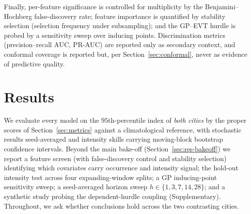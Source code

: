 \documentclass[11pt,a4paper]{article}
\begin{document}
Finally, per-feature significance is controlled for multiplicity by the
Benjamini--Hochberg false-discovery rate; feature importance is quantified by
stability selection (selection frequency under subsampling); and the GP--EVT
hurdle is probed by a sensitivity sweep over inducing points. Discrimination
metrics (precision--recall AUC, PR-AUC) are reported only as secondary context,
and conformal coverage is reported but, per Section~\ref{sec:conformal}, never as
evidence of predictive quality.

\section{Results}\label{sec:results}

We evaluate every model on the $95$th-percentile index of \emph{both cities} by
the proper scores of Section~\ref{sec:metrics} against a climatological reference,
with stochastic results seed-averaged and intensity skills carrying moving-block
bootstrap confidence intervals. Beyond the main bake-off
(Section~\ref{sec:res-bakeoff}) we report a feature screen (with false-discovery
control and stability selection) identifying which covariates carry occurrence and
intensity signal; the hold-out intensity test across four expanding-window splits;
a GP inducing-point sensitivity sweep; a seed-averaged horizon sweep
$h\in\{1,3,7,14,28\}$; and a synthetic study probing the dependent-hurdle
coupling (Supplementary). Throughout, we ask whether conclusions hold across the two contrasting cities.
\end{document}
